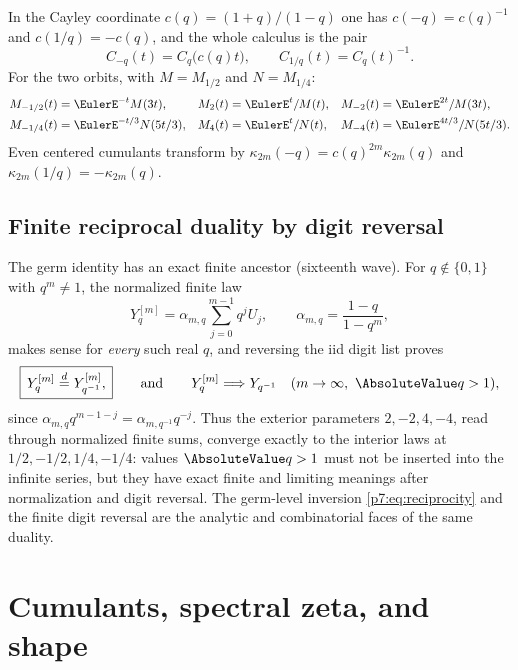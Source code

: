 \documentclass[11pt,oneside]{article}
\numberwithin{equation}{section}
\theoremstyle{definition}
\theoremstyle{remark}
\begin{document}
In the Cayley coordinate $c(q)=(1+q)/(1-q)$ one has $c(-q)=c(q)^{-1}$ and
$c(1/q)=-c(q)$, and the whole calculus is the pair
\begin{equation}\label{p7:eq:cayley-calculus}
 C_{-q}(t)=C_q\bigl(c(q)t\bigr),
 \qquad
 C_{1/q}(t)=C_q(t)^{-1}.
\end{equation}
For the two orbits, with $M=M_{1/2}$ and $N=M_{1/4}$:
\begin{align}
 M_{-1/2}(t)&=\EulerE^{-t}M(3t),
 &M_2(t)&=\EulerE^t/M(t),
 &M_{-2}(t)&=\EulerE^{2t}/M(3t),
 \label{p7:eq:dyadic-orbit}\\
 M_{-1/4}(t)&=\EulerE^{-t/3}N(5t/3),
 &M_4(t)&=\EulerE^t/N(t),
 &M_{-4}(t)&=\EulerE^{4t/3}/N(5t/3).
 \label{p7:eq:quartic-orbit}
\end{align}
Even centered cumulants transform by
$\kappa_{2m}(-q)=c(q)^{2m}\kappa_{2m}(q)$ and
$\kappa_{2m}(1/q)=-\kappa_{2m}(q)$.

\subsection{Finite reciprocal duality by digit reversal}

The germ identity has an exact finite ancestor (sixteenth wave).  For
$q\notin\{0,1\}$ with $q^m\ne1$, the normalized finite law
\begin{equation}\label{p7:eq:finite-law}
 Y_q^{[m]}=\alpha_{m,q}\sum_{j=0}^{m-1}q^jU_j,
 \qquad
 \alpha_{m,q}=\frac{1-q}{1-q^m},
\end{equation}
makes sense for \emph{every} such real $q$, and reversing the iid digit list
proves
\begin{equation}\label{p7:eq:finite-reciprocal}
 \boxed{\,Y_q^{[m]}\overset d=Y_{q^{-1}}^{[m]},\,}
 \qquad\text{and}\qquad
 Y_q^{[m]}\Longrightarrow Y_{q^{-1}}
 \quad(m\to\infty,\ \AbsoluteValue q>1),
\end{equation}
since $\alpha_{m,q}q^{m-1-j}=\alpha_{m,q^{-1}}q^{-j}$.  Thus the exterior
parameters $2,-2,4,-4$, read through normalized finite sums, converge exactly
to the interior laws at $1/2,-1/2,1/4,-1/4$: values $\AbsoluteValue q>1$ must not be
inserted into the infinite series, but they have exact finite and limiting
meanings after normalization and digit reversal.  The germ-level inversion
\eqref{p7:eq:reciprocity} and the finite digit reversal are the analytic and
combinatorial faces of the same duality.
\section{Cumulants, spectral zeta, and shape}
\label{p7:sec:cumulants}
\end{document}
